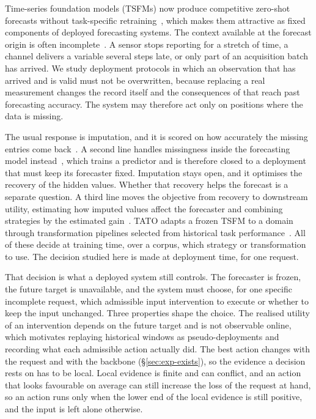 \documentclass{article}
\newcommand{\tsfm}{TSFM}
\begin{document}
Time-series foundation models (\tsfm{}s) now produce competitive zero-shot forecasts without
task-specific retraining~\citep{ansari2024chronos,chronosbolt2025,das2024timesfm,woo2024moirai,
chronos2_2025}, which makes them attractive as fixed components of deployed forecasting
systems. The context available at the forecast origin is often
incomplete~\citep{chen2024bitgraph,peng2025s4m}. A sensor stops reporting for a stretch of
time, a channel delivers a variable several steps late, or only part of an acquisition batch
has arrived. We study deployment protocols in which an observation that has arrived and is
valid must not be overwritten, because replacing a real measurement changes the record itself
and the consequences of that reach past forecasting accuracy. The system may therefore act
only on positions where the data is missing.

The usual response is imputation, and it is scored on how accurately the missing entries come
back~\citep{cao2018brits,tashiro2021csdi,du2023saits}. A second line handles missingness inside
the forecasting model instead~\citep{chen2024bitgraph,peng2025s4m}, which trains a predictor and
is therefore closed to a deployment that must keep its forecaster fixed. Imputation stays open, and it
optimises the recovery of the hidden values. Whether that recovery helps the forecast is a
separate question. A third line moves the objective from recovery to downstream utility, estimating
how imputed values affect the forecaster and combining strategies by the estimated
gain~\citep{wang2024taskoriented,hao2025toivsf,xu2026srdi}. TATO adapts a frozen \tsfm{} to a
domain through transformation pipelines selected from historical task
performance~\citep{qiu2026tato}. All of these decide at training time, over a corpus, which
strategy or transformation to use. The decision studied here is made at deployment time, for
one request.

That decision is what a deployed system still controls. The forecaster is frozen, the
future target is unavailable, and the system must choose, for one specific incomplete request,
which admissible input intervention to execute or whether to keep the input unchanged. Three
properties shape the choice. The realised utility of an intervention depends on the future
target and is not observable online, which motivates replaying historical windows as
pseudo-deployments and recording what each admissible action actually did. The best action
changes with the request and with the backbone (\S\ref{sec:exp-exists}), so the evidence a
decision rests on has to be local. Local evidence is finite and can
conflict, and an action that looks favourable on average can still increase the loss of the
request at hand, so an action runs only when the lower end of the local evidence is still
positive, and the input is left alone otherwise.
\end{document}
